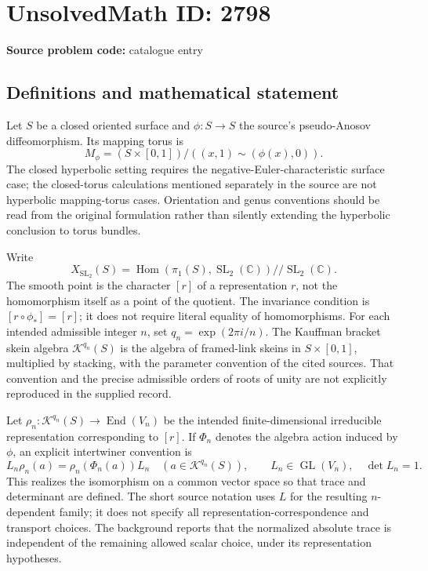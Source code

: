 \documentclass[11pt]{article}
\newcommand{\C}{\mathbb{C}}
\begin{document}
\section*{UnsolvedMath ID: 2798}
\textbf{Source problem code:} catalogue entry
\subsection{Definitions and mathematical statement}
Let \(S\) be a closed oriented surface and \(\phi:S\to S\) the source's pseudo-Anosov diffeomorphism. Its mapping torus is
\[
M_\phi=(S\times[0,1])/((x,1)\sim(\phi(x),0)).
\]
The closed hyperbolic setting requires the negative-Euler-characteristic surface case; the closed-torus calculations mentioned separately in the source are not hyperbolic mapping-torus cases. Orientation and genus conventions should be read from the original formulation rather than silently extending the hyperbolic conclusion to torus bundles.

Write
\[
X_{\operatorname{SL}_2}(S)=\operatorname{Hom}(\pi_1(S),\operatorname{SL}_2(\C))/\!/\operatorname{SL}_2(\C).
\]
The smooth point is the character \([r]\) of a representation \(r\), not the homomorphism itself as a point of the quotient. The invariance condition is \([r\circ\phi_*]=[r]\); it does not require literal equality of homomorphisms. For each intended admissible integer \(n\), set \(q_n=\exp(2\pi i/n)\). The Kauffman bracket skein algebra \(\mathcal K^{q_n}(S)\) is the algebra of framed-link skeins in \(S\times[0,1]\), multiplied by stacking, with the parameter convention of the cited sources. That convention and the precise admissible orders of roots of unity are not explicitly reproduced in the supplied record.

Let \(\rho_n:\mathcal K^{q_n}(S)\to\operatorname{End}(V_n)\) be the intended finite-dimensional irreducible representation corresponding to \([r]\). If \(\Phi_n\) denotes the algebra action induced by \(\phi\), an explicit intertwiner convention is
\[
L_n\rho_n(a)=\rho_n(\Phi_n(a))L_n
\quad(a\in\mathcal K^{q_n}(S)),\qquad
L_n\in\operatorname{GL}(V_n),\quad\det L_n=1.
\]
This realizes the isomorphism on a common vector space so that trace and determinant are defined. The short source notation uses \(L\) for the resulting \(n\)-dependent family; it does not specify all representation-correspondence and transport choices. The background reports that the normalized absolute trace is independent of the remaining allowed scalar choice, under its representation hypotheses.
\end{document}
